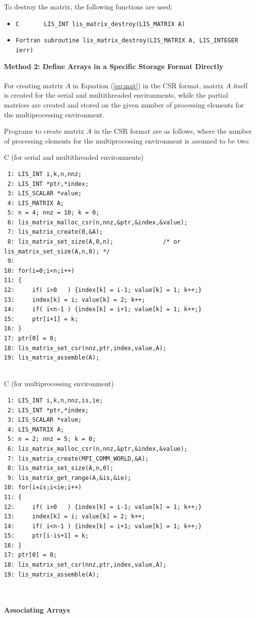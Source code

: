 \documentclass[a4paper]{article}
\begin{document}
To destroy the matrix, the following functions are used:
\begin{itemize}
\item \verb|C       LIS_INT lis_matrix_destroy(LIS_MATRIX A)|
\item \verb|Fortran subroutine lis_matrix_destroy(LIS_MATRIX A, LIS_INTEGER ierr)|
\end{itemize}
\vspace*{5mm}

\noindent
{\bf Method 2: Define Arrays in a Specific Storage Format Directly}\\
\\ 
\indent
For creating matrix $A$ in Equation (\ref{eq:mat}) in the
CSR format, 
matrix $A$ itself is created for the serial and multithreaded environments,
while the partial matrices are created and 
stored on the given number of processing elements 
for the multiprocessing environment.

Programs to create matrix $A$ in the CSR format are as follows,
where the number of processing elements for the multiprocessing environment is assumed to be two: 
\begin{itembox}[l]{C (for serial and multithreaded environments)}
\small
\begin{verbatim}
 1: LIS_INT i,k,n,nnz;
 2: LIS_INT *ptr,*index;
 3: LIS_SCALAR *value;
 4: LIS_MATRIX A;
 5: n = 4; nnz = 10; k = 0;
 6: lis_matrix_malloc_csr(n,nnz,&ptr,&index,&value);
 7: lis_matrix_create(0,&A);
 8: lis_matrix_set_size(A,0,n);              /* or lis_matrix_set_size(A,n,0); */ 
 9: 
10: for(i=0;i<n;i++)
11: {
12:     if( i>0   ) {index[k] = i-1; value[k] = 1; k++;}
13:     index[k] = i; value[k] = 2; k++;
14:     if( i<n-1 ) {index[k] = i+1; value[k] = 1; k++;}
15:     ptr[i+1] = k;
16: }
17: ptr[0] = 0;
18: lis_matrix_set_csr(nnz,ptr,index,value,A);
19: lis_matrix_assemble(A); 


\end{verbatim}
\end{itembox}
\begin{itembox}[l]{C (for multiprocessing environment)}
\small
\begin{verbatim}
 1: LIS_INT i,k,n,nnz,is,ie;
 2: LIS_INT *ptr,*index;
 3: LIS_SCALAR *value;
 4: LIS_MATRIX A;
 5: n = 2; nnz = 5; k = 0;
 6: lis_matrix_malloc_csr(n,nnz,&ptr,&index,&value);
 7: lis_matrix_create(MPI_COMM_WORLD,&A);
 8: lis_matrix_set_size(A,n,0);
 9: lis_matrix_get_range(A,&is,&ie);
10: for(i=is;i<ie;i++)
11: {
12:     if( i>0   ) {index[k] = i-1; value[k] = 1; k++;}
13:     index[k] = i; value[k] = 2; k++;
14:     if( i<n-1 ) {index[k] = i+1; value[k] = 1; k++;}
15:     ptr[i-is+1] = k;
16: }
17: ptr[0] = 0;
18: lis_matrix_set_csr(nnz,ptr,index,value,A);
19: lis_matrix_assemble(A); 
\end{verbatim}
\end{itembox}
\\ \\
\noindent
{\bf Associating Arrays}
\end{document}
